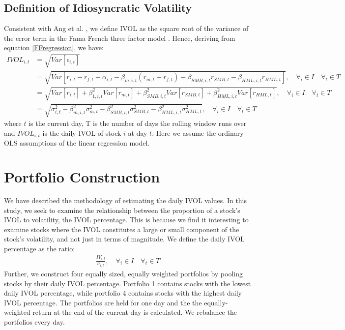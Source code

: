 \subsection{Definition of Idiosyncratic Volatility}
Consistent with Ang et al. \cite{angetal06}, we define IVOL as the square root of the variance of the error term in the Fama French three factor model \cite{famafrench}. Hence, deriving from equation \ref{FFregression}, we have:
 \begin{align}
 IVOL_{i,t} &= \sqrt{Var[\epsilon_{i,t}]} \\
  &= \sqrt{Var[r_{i,t} - r_{f,t}- \alpha_{i,t}-\beta_{m,i,t}(r_{m,t} - r_{f,t}) - \beta_{SMB,i,t}r_{SMB,t} - \beta_{HML,i,t}r_{HML,t}]},  \quad  \forall_i \in I \quad  \forall_t \in T \\
 &= \sqrt{Var[r_{i,t}]+\beta_{1,i,t}^2Var[r_{m,t}]+\beta_{SMB,i,t}^2Var[r_{SMB,t}]+\beta_{HML,i,t}^2Var[r_{HML,t}]}, \quad  \forall_i \in I \quad  \forall_t \in T \\ 
 &= \sqrt{\sigma_{i,t}^2 - \beta^2_{m,i,t} \sigma_{m,t}^{2}- \beta^2_{SMB,i,t} \sigma_{SMB,t}^{2}- \beta^2_{HML,i,t} \sigma_{HML,t}^{2}}, \quad  \forall_i \in I \quad  \forall_t \in T
 \end{align}
where $t$ is the current day, T is the number of days the rolling window runs over and $IVOL_{i,t}$ is the daily IVOL of stock $i$ at day $t$. Here we assume the ordinary OLS assumptions of the linear regression model. 

\section{Portfolio Construction}
We have described the methodology of estimating the daily IVOL values. In this study, we seek to examine the relationship between the proportion of a stock's IVOL to volatility, the IVOL percentage. This is because we find it interesting to examine stocks where the IVOL constitutes a large or small component of the stock's volatility, and not just in terms of magnitude. We define the daily IVOL percentage as the ratio:
\begin{align}
    \frac{IV_{i,t}}{\sigma_{i,t}}, \quad  \forall_i \in I \quad  \forall_t \in T
\end{align}
Further, we construct four equally sized, equally weighted portfolios by pooling stocks by their daily IVOL percentage. Portfolio 1 contains stocks with the lowest daily IVOL percentage, while portfolio 4 contains stocks with the highest daily IVOL percentage. The portfolios are held for one day and the the equally-weighted return at the end of the current day is calculated. We rebalance the portfolios every day. 


